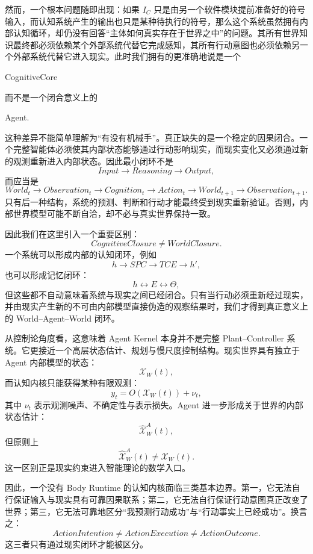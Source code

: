然而，一个根本问题随即出现：如果 $I_C$ 只是由另一个软件模块提前准备好的符号输入，而认知系统产生的输出也只是某种待执行的符号，那么这个系统虽然拥有内部认知循环，却仍没有回答“主体如何真实存在于世界之中”的问题。其所有世界知识最终都必须依赖某个外部系统代替它完成感知，其所有行动意图也必须依赖另一个外部系统代替它进入现实。此时我们拥有的更准确地说是一个
\begin{statementbox}
CognitiveCore
\end{statementbox}
而不是一个闭合意义上的
\begin{statementbox}
Agent.
\end{statementbox}

这种差异不能简单理解为“有没有机械手”。真正缺失的是一个稳定的因果闭合。一个完整智能体必须使其内部状态能够通过行动影响现实，而现实变化又必须通过新的观测重新进入内部状态。因此最小闭环不是
\[
Input
\rightarrow
Reasoning
\rightarrow
Output,
\]
而应当是
\[
\boxed{
World_t
\rightarrow
Observation_t
\rightarrow
Cognition_t
\rightarrow
Action_t
\rightarrow
World_{t+1}
\rightarrow
Observation_{t+1}.
}
\]
只有后一种结构，系统的预测、判断和行动才能最终受到现实重新验证。否则，内部世界模型可能不断自洽，却不必与真实世界保持一致。

因此我们在这里引入一个重要区别：
\[
\boxed{
CognitiveClosure
\neq
WorldClosure.
}
\]
一个系统可以形成内部的认知闭环，例如
\[
h
\rightarrow
SPC
\rightarrow
TCE
\rightarrow
h',
\]
也可以形成记忆闭环：
\[
h
\leftrightarrow
E
\leftrightarrow
\Theta,
\]
但这些都不自动意味着系统与现实之间已经闭合。只有当行动必须重新经过现实，并由现实产生新的不可由内部模型直接伪造的观察结果时，我们才得到真正意义上的 World--Agent--World 闭环。

从控制论角度看，这意味着 Agent Kernel 本身并不是完整 Plant--Controller 系统。它更接近一个高层状态估计、规划与慢尺度控制结构。现实世界具有独立于 Agent 内部模型的状态：
\[
\mathcal{X}_{W}(t),
\]
而认知内核只能获得某种有限观测：
\[
y_t
=
O
\left(
\mathcal{X}_{W}(t)
\right)
+
\nu_t,
\]
其中 $\nu_t$ 表示观测噪声、不确定性与表示损失。Agent 进一步形成关于世界的内部状态估计：
\[
\hat{\mathcal{X}}_{W}^{A}(t),
\]
但原则上
\[
\boxed{
\hat{\mathcal{X}}_{W}^{A}(t)
\neq
\mathcal{X}_{W}(t).
}
\]
这一区别正是现实约束进入智能理论的数学入口。

因此，一个没有 Body Runtime 的认知内核面临三类基本边界。第一，它无法自行保证输入与现实具有可靠因果联系；第二，它无法自行保证行动意图真正改变了世界；第三，它无法可靠地区分“我预测行动成功”与“行动事实上已经成功”。换言之：
\[
\boxed{
ActionIntention
\neq
ActionExecution
\neq
ActionOutcome.
}
\]
这三者只有通过现实闭环才能被区分。

